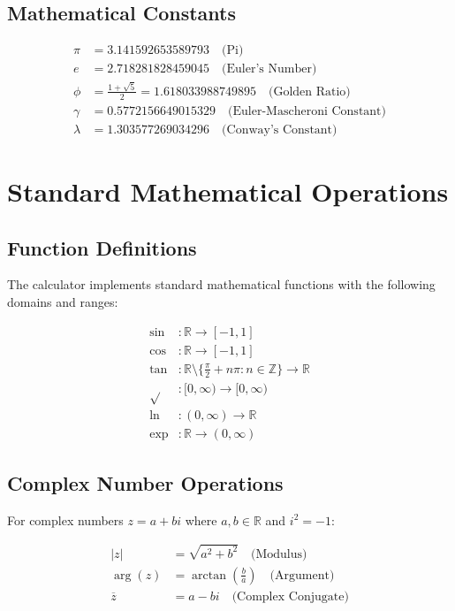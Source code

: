 \documentclass[12pt,a4paper]{article}
\begin{document}
\subsection{Mathematical Constants}

\begin{align}
\pi &= 3.141592653589793 \quad \text{(Pi)} \\
e &= 2.718281828459045 \quad \text{(Euler's Number)} \\
\phi &= \frac{1 + \sqrt{5}}{2} = 1.618033988749895 \quad \text{(Golden Ratio)} \\
\gamma &= 0.5772156649015329 \quad \text{(Euler-Mascheroni Constant)} \\
\lambda &= 1.303577269034296 \quad \text{(Conway's Constant)}
\end{align}

\section{Standard Mathematical Operations}

\subsection{Function Definitions}

The calculator implements standard mathematical functions with the following domains and ranges:

\begin{align}
\sin &: \mathbb{R} \rightarrow [-1, 1] \\
\cos &: \mathbb{R} \rightarrow [-1, 1] \\
\tan &: \mathbb{R} \setminus \{\frac{\pi}{2} + n\pi : n \in \mathbb{Z}\} \rightarrow \mathbb{R} \\
\sqrt{} &: [0, \infty) \rightarrow [0, \infty) \\
\ln &: (0, \infty) \rightarrow \mathbb{R} \\
\exp &: \mathbb{R} \rightarrow (0, \infty)
\end{align}

\subsection{Complex Number Operations}

For complex numbers $z = a + bi$ where $a, b \in \mathbb{R}$ and $i^2 = -1$:

\begin{align}
|z| &= \sqrt{a^2 + b^2} \quad \text{(Modulus)} \\
\arg(z) &= \arctan\left(\frac{b}{a}\right) \quad \text{(Argument)} \\
\overline{z} &= a - bi \quad \text{(Complex Conjugate)}
\end{align}
\end{document}
